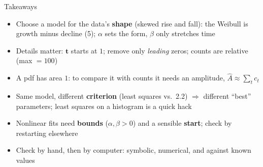 \documentclass[aspectratio=169,11pt]{beamer}
\begin{document}
\begin{frame}{Takeaways}\small
\begin{itemize}
\item Choose a model for the data's \textbf{shape} (skewed rise and fall): the Weibull is growth minus decline (5); $\alpha$ sets the form, $\beta$ only stretches time
\item Details matter: $\bm t$ starts at $1$; remove only \emph{leading} zeros; counts are relative (max $=100$)
\item A pdf has area $1$: to compare it with counts it needs an amplitude, $\hat A\approx\sum_tc_t$
\item Same model, different \textbf{criterion} (least squares vs.\ 2.2) $\Rightarrow$ different ``best'' parameters; least squares on a histogram is a quick hack
\item Nonlinear fits need \textbf{bounds} ($\alpha,\beta>0$) and a sensible \textbf{start}; check by restarting elsewhere
\item Check by hand, then by computer: symbolic, numerical, and against known values
\end{itemize}
\end{frame}
\end{document}
